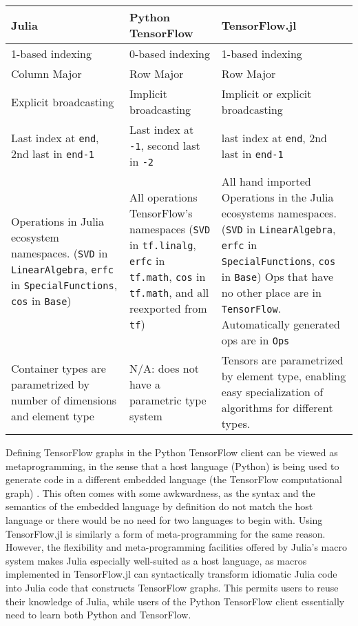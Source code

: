 \documentclass{book}
\begin{document}
{	\renewcommand{\arraystretch}{1.5}
	\begin{tabularx}{\textwidth}{XXX}
		\toprule
		\textbf{Julia} & \textbf{Python TensorFlow} & \textbf{TensorFlow.jl}\\
		\midrule
		1-based indexing & 0-based indexing & 1-based indexing \\
		Column Major & Row Major & Row Major \\
		Explicit broadcasting & Implicit broadcasting & Implicit or explicit broadcasting \\
		Last index at \texttt{end}, 2nd last in \texttt{end-1} & Last index at \texttt{-1}, second last in \texttt{-2} & last index at \texttt{end}, 2nd last in \texttt{end-1} \\
		Operations in Julia ecosystem namespaces. (\texttt{SVD} in \texttt{LinearAlgebra}, \texttt{erfc} in \texttt{SpecialFunctions}, \texttt{cos} in \texttt{Base}) & All operations TensorFlow's namespaces (\texttt{SVD} in \texttt{tf.linalg}, \texttt{erfc} in \texttt{tf.math}, \texttt{cos} in \texttt{tf.math}, and all reexported from \texttt{tf}) & All hand imported Operations in the Julia ecosystems namespaces. (\texttt{SVD} in \texttt{LinearAlgebra}, \texttt{erfc} in \texttt{SpecialFunctions}, \texttt{cos} in \texttt{Base}) Ops that have no other place are in \texttt{TensorFlow}. Automatically generated ops are in \texttt{Ops} \\
		
		Container types are parametrized by number of dimensions and element type & N/A: does not have a parametric type system & Tensors are parametrized by element type, enabling easy specialization of algorithms for different types. \\
		\bottomrule
	\end{tabularx}
}


Defining TensorFlow graphs in the Python TensorFlow client can be viewed
as metaprogramming, in the sense that a host language (Python) is being
used to generate code in a different embedded language (the TensorFlow
computational graph) \citep{MLandPL}. This often comes with some
awkwardness, as the syntax and the semantics of the embedded language by
definition do not match the host language or there would be no need for
two languages to begin with. Using TensorFlow.jl is similarly a form of
meta-programming for the same reason. However, the flexibility and
meta-programming facilities offered by Julia's macro system makes Julia
especially well-suited as a host language, as macros implemented in
TensorFlow.jl can syntactically transform idiomatic Julia code into
Julia code that constructs TensorFlow graphs. This permits users to
reuse their knowledge of Julia, while users of the Python TensorFlow
client essentially need to learn both Python and TensorFlow.
\end{document}
